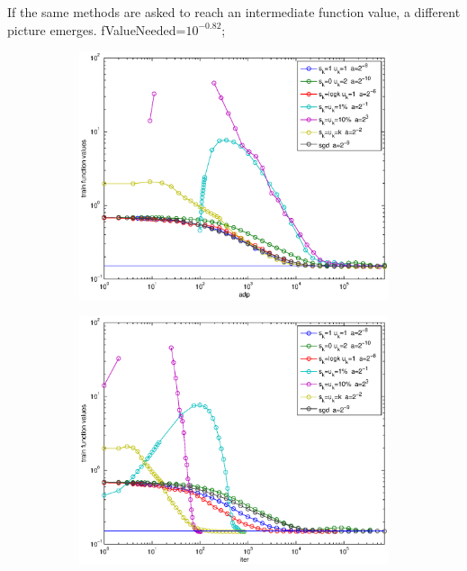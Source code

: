 \documentclass[12pt]{article}
\begin{document}
	\newpage
	
	If the same methods are asked to reach an intermediate function value, a different picture emerges. fValueNeeded=$10^{-0.82}$;
	
	\begin{figure}[H]
	\begin{subfigure}[b]{.5\linewidth}
		        \includegraphics[width=4in]{Figures/whowins2-1.eps}
	\end{subfigure}%
	\begin{subfigure}[b]{.5\linewidth}
		        \includegraphics[width=4in]{Figures/whowins2-2.eps}
	\end{subfigure}%


\end{figure}
\end{document}
